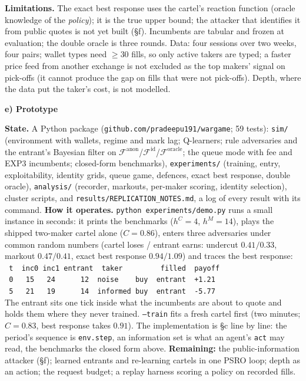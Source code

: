 \documentclass[10pt]{article}
\newcommand{\Fanon}{\mathcal{F}^{\mathrm{anon}}}
\newcommand{\Fid}{\mathcal{F}^{\mathrm{id}}}
\newcommand{\For}{\mathcal{F}^{\mathrm{oracle}}}
\newcommand{\sect}[1]{\par\vspace{5pt}\noindent\textbf{#1}\par\vspace{1.5pt}\noindent}
\begin{document}
\textbf{Limitations.} The exact best response uses the cartel's reaction function (oracle knowledge of the \emph{policy}); it is the true upper bound; the attacker that identifies it from public quotes is not yet built (\S f). Incumbents are tabular and frozen at evaluation; the double oracle is three rounds. Data: four sessions over two weeks, four pairs; wallet types need $\ge30$ fills, so only active takers are typed; a faster price feed from another exchange is not excluded as the top makers' signal on pick-offs (it cannot produce the gap on fills that were not pick-offs). Depth, where the data put the taker's cost, is not modelled.

\sect{e) Prototype}
\textbf{State.} A Python package (\texttt{github.com/pradeepu191/wargame}; 59 tests): \texttt{sim/} (environment with wallets, regime and mark lag; Q-learners; rule adversaries and the entrant's Bayesian filter on $\Fanon$/$\Fid$/$\For$; the queue mode with fee and EXP3 incumbents; closed-form benchmarks), \texttt{experiments/} (training, entry, exploitability, identity grids, queue game, defences, exact best response, double oracle), \texttt{analysis/} (recorder, markouts, per-maker scoring, identity selection), cluster scripts, and \texttt{results/REPLICATION\_NOTES.md}, a log of every result with its command. \textbf{How it operates.} \texttt{python experiments/demo.py} runs a small instance in seconds: it prints the benchmarks ($h^C=4$, $h^M=14$), plays the shipped two-maker cartel alone ($C=0.86$), enters three adversaries under common random numbers (cartel loses / entrant earns: undercut $0.41/0.33$, markout $0.47/0.41$, exact best response $0.94/1.09$) and traces the best response: \\[1pt]
{\footnotesize\texttt{\ t\ \ inc0\ inc1\ entrant\ \ taker\ \ \ \ \ \ \ \ \ filled\ \ payoff}\\
\texttt{\ 0\ \ \ 15\ \ \ 24\ \ \ \ \ \ 12\ \ noise\ \ \ \ buy\ \ entrant\ \ +1.21}\\
\texttt{\ 5\ \ \ 21\ \ \ 19\ \ \ \ \ \ 14\ \ informed\ buy\ \ entrant\ \ -5.77}}\\[1pt]
The entrant sits one tick inside what the incumbents are about to quote and holds them where they never trained. \texttt{--train} fits a fresh cartel first (two minutes; $C=0.83$, best response takes $0.91$). The implementation is \S c line by line: the period's sequence is \texttt{env.step}, an information set is what an agent's \texttt{act} may read, the benchmarks the closed form above. \textbf{Remaining:} the public-information attacker (\S f); learned entrants and re-learning cartels in one PSRO loop; depth as an action; the request budget; a replay harness scoring a policy on recorded fills.
\end{document}
